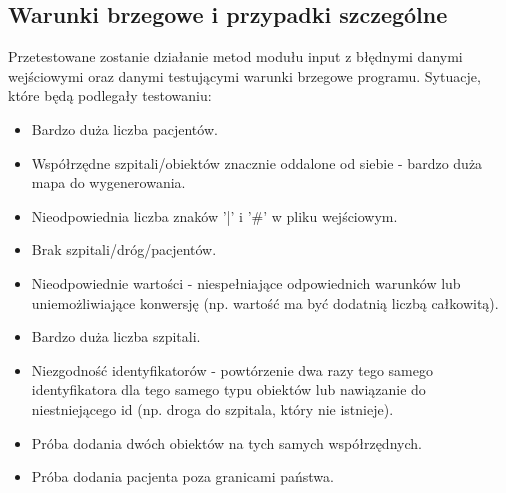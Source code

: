 \documentclass{article}
\begin{document}
    \subsection{Warunki brzegowe i przypadki szczególne}
    Przetestowane zostanie działanie metod modułu input z błędnymi danymi wejściowymi oraz danymi testującymi warunki brzegowe programu. Sytuacje, które będą podlegały testowaniu:
    \begin{itemize}
        \item Bardzo duża liczba pacjentów.
        \item Współrzędne szpitali/obiektów znacznie oddalone od siebie - bardzo duża mapa do wygenerowania.
        \item Nieodpowiednia liczba znaków '|' i '\#' w pliku wejściowym.
        \item Brak szpitali/dróg/pacjentów.
        \item Nieodpowiednie wartości - niespełniające odpowiednich warunków lub uniemożliwiające konwersję (np. wartość ma być dodatnią liczbą całkowitą).
        \item Bardzo duża liczba szpitali.
        \item Niezgodność identyfikatorów - powtórzenie dwa razy tego samego identyfikatora dla tego samego typu obiektów lub nawiązanie do niestniejącego id (np. droga do szpitala, który nie istnieje).
        \item Próba dodania dwóch obiektów na tych samych współrzędnych.
        \item Próba dodania pacjenta poza granicami państwa.
    \end{itemize}
\end{document}
